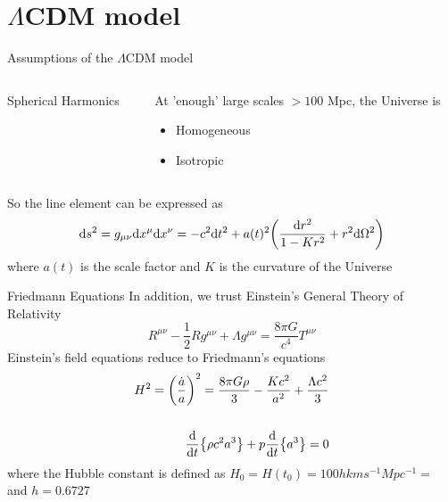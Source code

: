 \documentclass{beamer}
\begin{document}
\section{$\Lambda$CDM model}
\begin{frame}{Assumptions of the $\Lambda$CDM model}

\begin{columns}
		\begin{column}{3cm}
			\begin{center}
				\tiny
				Spherical Harmonics
			\end{center}
		\end{column}
		\begin{column}{6cm}
			At 'enough' large scales $> 100$ Mpc, the Universe is
	\begin{itemize}
  		\item Homogeneous  
  		\item Isotropic
	\end{itemize}
		\end{column}
	\end{columns}

	\vspace{0.5cm}
So the line element can be expressed as
\begin{equation*}
    \dd s^2 = g_{\mu \nu} \dd x^\mu \dd x^\nu = -c^2 \dd t^2 + a(t)^2 
    \qty( \frac{\dd r^2}{1-K r^2} + r^2 \dd \Omega ^2 )
\end{equation*}
where $a(t)$ is the scale factor and $K$ is the curvature of the Universe
\end{frame}

\begin{frame}{Friedmann Equations}
In addition, we trust Einstein's General Theory of Relativity
\begin{equation*}
    R^{\mu \nu} - \frac{1}{2}R g^{\mu \nu} + \Lambda g^{\mu \nu} = \frac{8 \pi G}{c^4} T^{\mu \nu}
\end{equation*}
\vspace{0.3cm}
Einstein’s field equations reduce to Friedmann’s equations
\begin{eqnarray}
     H^2 = \qty(\frac{\dot{a}}{a})^2 = \frac{8 \pi G \rho}{3} - \frac{K c^2}{a^2} + \frac{\Lambda  c^2}{3} \notag \\
\notag \\
     \dv{}{t}\qty{\rho c^2 a^3} + p \dv{}{t} \qty{a^3} =0 \notag
\end{eqnarray}
 where the Hubble constant is defined as $H_0 = H(t_0) = 100 h km s^{-1} Mpc^{-1} = $ and $h = 0.6727$
\end{frame}
\end{document}
